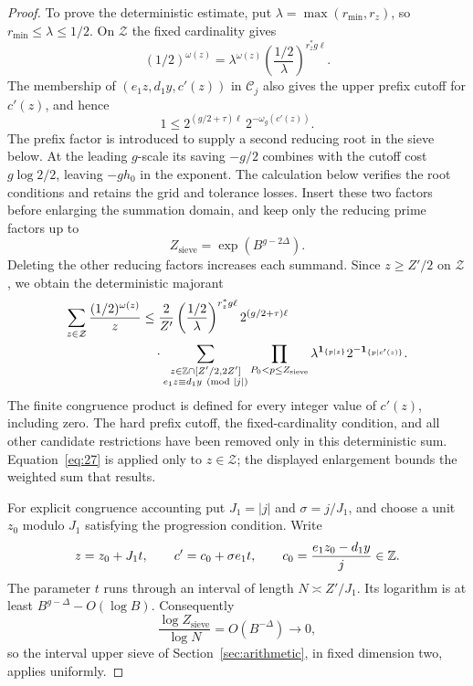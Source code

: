 \begin{proof}
To prove the deterministic estimate, put
$\lambda=\max(r_{\min},r_z)$, so $r_{\min}\le\lambda\le1/2$.
On $\mathcal Z$ the fixed cardinality gives
\[
 (1/2)^{\omega(z)}
 =\lambda^{\omega(z)}
       \left(\frac{1/2}{\lambda}\right)^{r_z^*g\ell}.
\]
The membership of $(e_1z,d_1y,c'(z))$ in $\mathcal C_j$ also gives
the upper prefix cutoff for $c'(z)$, and hence
\[
 1\le2^{(g/2+\tau)\ell}\,2^{-\omega_g(c'(z))}.
\]
The prefix factor is introduced to supply a second reducing root in the
sieve below. At the leading $g$-scale its saving $-g/2$ combines with
the cutoff cost $g\log2/2$, leaving $-gh_0$ in the exponent.
The calculation below verifies the root conditions and retains the grid
and tolerance losses.
Insert these two factors before enlarging the summation domain, and
keep only the reducing prime factors up to
\[
 Z_{\mathrm{sieve}}=\exp(B^{g-2\Delta}).
\]
Deleting the other reducing factors increases each summand. Since
$z\ge Z'/2$ on $\mathcal Z$, we obtain the deterministic majorant
\[
\begin{split}
 \sum_{z\in\mathcal Z}\frac{(1/2)^{\omega(z)}}z
 &\le \frac{2}{Z'}
       \left(\frac{1/2}{\lambda}\right)^{r_z^*g\ell}
       2^{(g/2+\tau)\ell}\\
 &\quad\cdot
 \sum_{\substack{z\in\mathbb Z\cap[Z'/2,2Z']\\
                 e_1z\equiv d_1y\pmod{|j|}}}
 \prod_{P_0<p\le Z_{\mathrm{sieve}}}
       \lambda^{\mathbf 1_{\{p\mid z\}}}
       2^{-\mathbf 1_{\{p\mid c'(z)\}}}.
\end{split}
\]
The finite congruence product is defined for every integer value of
$c'(z)$, including zero. The hard prefix cutoff, the fixed-cardinality
condition, and all other candidate restrictions have been removed only
in this deterministic sum. Equation~\eqref{eq:27} is applied only to
$z\in\mathcal Z$; the displayed enlargement bounds the weighted sum
that results.

For explicit congruence accounting put $J_1=|j|$ and
$\sigma=j/J_1$, and choose a unit $z_0$ modulo $J_1$ satisfying the
progression condition.  Write
\[
 z=z_0+J_1t,
 \qquad
 c'=c_0+\sigma e_1t,
 \qquad
 c_0=\frac{e_1z_0-d_1y}{j}\in\mathbb Z.
\]
The parameter $t$ runs through an interval of length
$N\asymp Z'/J_1$.  Its logarithm is at least
$B^{g-\Delta}-O(\log B)$.  Consequently
\[
 \frac{\log Z_{\mathrm{sieve}}}{\log N}=O(B^{-\Delta})\longrightarrow0,
\]
so the interval upper sieve of Section~\ref{sec:arithmetic}, in fixed
dimension two, applies uniformly.


\end{proof}
